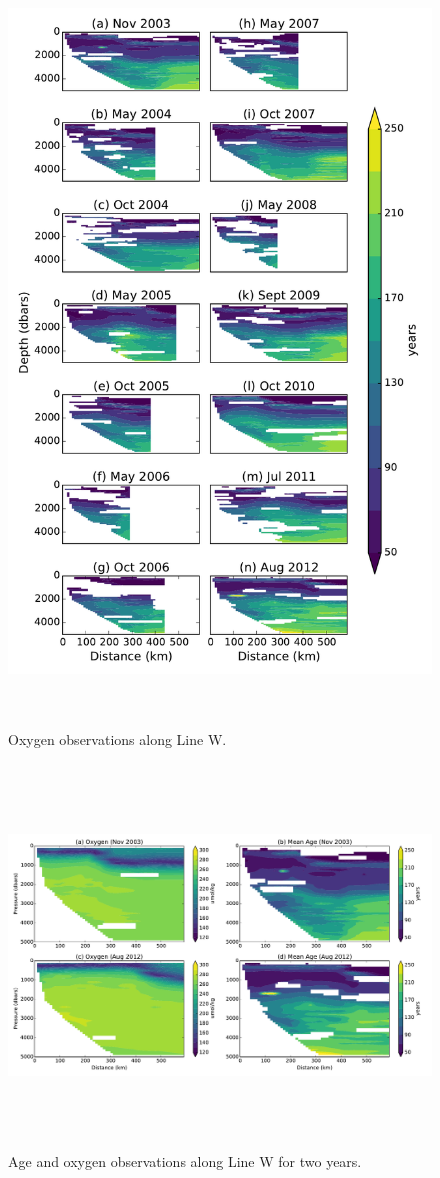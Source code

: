 \documentclass[11pt]{article}
\begin{document}
\begin{figure}[b!]
    \centering
    \includegraphics[height=8in]{linew_age_obs.pdf}
    \caption{Oxygen observations along Line W. }
\end{figure}

\begin{figure}[b!]
    \centering
    \includegraphics[height=4in]{age_oxygen_figure1.pdf}
    \caption{Age and oxygen observations along Line W for two years.}
\end{figure}
\end{document}
